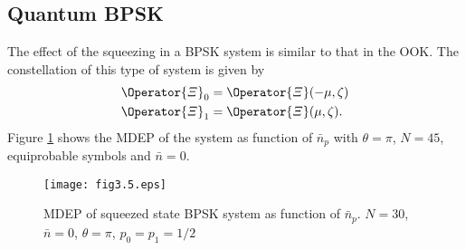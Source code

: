     \subsection{Quantum BPSK}
    The effect of the squeezing in a BPSK system is similar to that in the OOK. The constellation
    of this type of system is given by
    \begin{subequations}
        \begin{align}
            \Operator{\varXi}_0 &= \Operator{\varXi}(-\mu,\zeta)\\
            \Operator{\varXi}_1 &= \Operator{\varXi}(\mu,\zeta).
        \end{align}
    \end{subequations}
    Figure \ref{fig:3.5} shows the MDEP of the system as function of $\bar{n}_p$
    with $\theta=\pi$, $N=45$, equiprobable symbols and $\bar{n}=0$.

    \begin{figure}[t]
        \begin{center}
            \texttt{[image: fig3.5.eps]}
            \caption{MDEP of squeezed state BPSK system as function of $\bar{n}_p$. 
                $N=30$, $\bar{n}=0$, $\theta=\pi$, $p_0=p_1=1/2$}
            \label{fig:3.5}
        \end{center}     
    \end{figure}